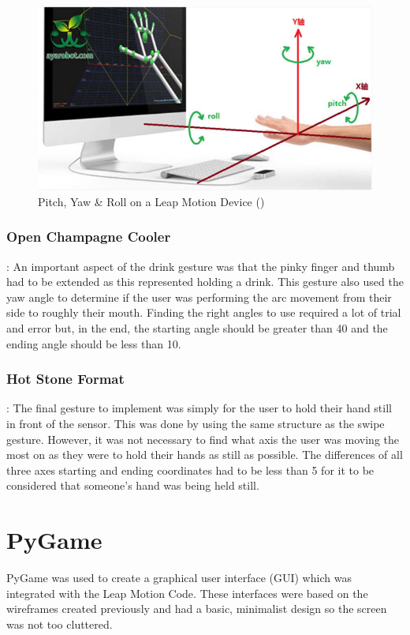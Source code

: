 \documentclass{l4proj}
\begin{document}
\begin{figure}[!htb]
    \centering
    \includegraphics[scale = 0.5]{images/yaw.png}
    \caption{Pitch, Yaw \& Roll on a Leap Motion Device (\cite{ProgrammerSought})}
    \label{fig:yaw}
\end{figure}

\subsubsection{Open Champagne Cooler}: An important aspect of the drink gesture was that the pinky finger and thumb had to be extended as this represented holding a drink. This gesture also used the yaw angle to determine if the user was performing the arc movement from their side to roughly their mouth. Finding the right angles to use required a lot of trial and error but, in the end, the starting angle should be greater than 40 and the ending angle should be less than 10.

\subsubsection{Hot Stone Format}: The final gesture to implement was simply for the user to hold their hand still in front of the sensor. This was done by using the same structure as the swipe gesture. However, it was not necessary to find what axis the user was moving the most on as they were to hold their hands as still as possible. The differences of all three axes starting and ending coordinates had to be less than 5 for it to be considered that someone's hand was being held still.

\section{PyGame}
PyGame was used to create a graphical user interface (GUI) which was integrated with the Leap Motion Code. These interfaces were based on the wireframes created previously and had a basic, minimalist design so the screen was not too cluttered. 
\end{document}
